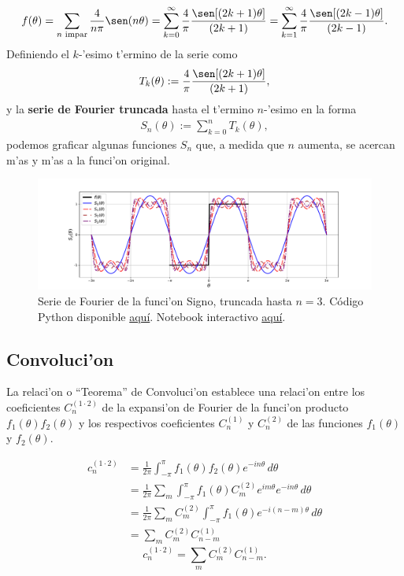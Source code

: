 \begin{align}
f(\theta)=\sum_{n\text{ impar}}\frac{4}{n\pi}\sen(n\theta)=\sum_{k=0}^{\infty}\frac{4}{\pi}\frac{\sen[(2k+1)\theta]}{(2k+1)}=\sum_{k=1}^{\infty}\frac{4}{\pi}\frac{\sen[(2k-1)\theta]}{(2k-1)}.
\end{align}
Definiendo el $k$-'esimo t'ermino de la serie como 
\begin{align}
T_{k}(\theta):=\frac{4}{\pi}\frac{\sen[(2k+1)\theta]}{(2k+1)},
\end{align}
y la \textbf{serie de Fourier truncada} hasta el t'ermino $n$-'esimo en la forma
\begin{align}
S_n(\theta):=\sum_{k=0}^n T_{k}(\theta),
\end{align}
podemos graficar algunas funciones $S_n$ que, a medida que $n$ aumenta, se acercan m'as y m'as a la funci'on original.
\begin{figure}[h]
\centering
\includegraphics[scale=0.4]{figs/fig-Fourier-serie-signo.pdf}
\caption{Serie de Fourier de la funci'on Signo, truncada hasta $n=3$. Código Python disponible \href{https://github.com/gfrubi/FM2/blob/master/figuras-editables/fig-Fourier-serie-signo.py}{aquí}. Notebook interactivo \href{https://github.com/gfrubi/FM2/blob/master/Notebooks/Ejemplo-Serie-Fourier-Funcion-Signo.ipynb}{aquí}.}
\label{im:signo}
\end{figure}

\subsection{Convoluci'on}

La relaci'on o ``Teorema'' de Convoluci'on establece una relaci'on entre los coeficientes $C_{n}^{(1\cdot 2)}$ de la expansi'on de Fourier de la funci'on producto $f_1(\theta)f_2(\theta)$ y los respectivos coeficientes $C_{n}^{(1)}$ y $C_{n}^{(2)}$ de las funciones $f_1(\theta)$ y $f_2(\theta)$.

\begin{align}
c_n^{(1\cdot 2)} &= \frac{1}{2\pi}\int_{-\pi}^\pi f_1(\theta)f_2(\theta)e^{-in\theta}\,d\theta \\
 &= \frac{1}{2\pi}\sum_m \int_{-\pi}^\pi f_1(\theta)C_m^{(2)}e^{im\theta}e^{-in\theta}\,d\theta \\
 &= \frac{1}{2\pi}\sum_m C_m^{(2)}\int_{-\pi}^\pi f_1(\theta)e^{-i(n-m)\theta}\,d\theta \\
 &= \sum_m C_m^{(2)}C_{n-m}^{(1)}
\end{align}
\begin{equation}\label{conv}
\boxed{c_n^{(1\cdot 2)} = \sum_m C_m^{(2)}C_{n-m}^{(1)}.}
\end{equation}


